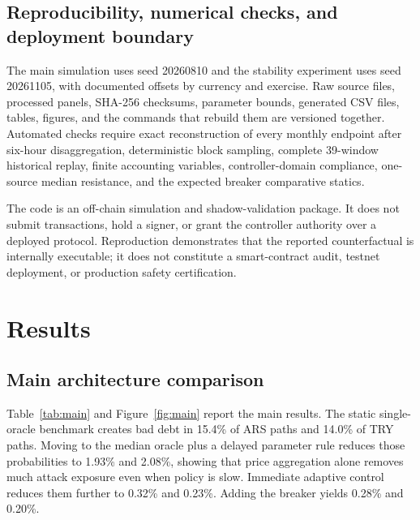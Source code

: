 \documentclass[sn-vancouver,Numbered]{sn-jnl}
\begin{document}
\subsection{Reproducibility, numerical checks, and deployment boundary}

The main simulation uses seed 20260810 and the stability experiment uses seed
20261105, with documented offsets by currency and exercise. Raw source files,
processed panels, SHA-256 checksums, parameter bounds, generated CSV files,
tables, figures, and the commands that rebuild them are versioned together.
Automated checks require exact reconstruction of every monthly endpoint after
six-hour disaggregation, deterministic block sampling, complete 39-window
historical replay, finite accounting variables, controller-domain compliance,
one-source median resistance, and the expected breaker comparative statics.

The code is an off-chain simulation and shadow-validation package. It does not
submit transactions, hold a signer, or grant the controller authority over a
deployed protocol. Reproduction demonstrates that the reported counterfactual
is internally executable; it does not constitute a smart-contract audit,
testnet deployment, or production safety certification.

\section{Results}\label{sec:results}

\subsection{Main architecture comparison}

Table~\ref{tab:main} and Figure~\ref{fig:main} report the main results. The static single-oracle benchmark creates bad debt in 15.4\% of ARS paths and 14.0\% of TRY paths. Moving to the median oracle plus a delayed parameter rule reduces those probabilities to 1.93\% and 2.08\%, showing that price aggregation alone removes much attack exposure even when policy is slow. Immediate adaptive control reduces them further to 0.32\% and 0.23\%. Adding the breaker yields 0.28\% and 0.20\%.

\begin{table}[t]
\centering
\caption{Main bootstrap results. Credit is cumulative accepted credit in initial-ceiling units; oracle MAE is mean absolute log-ratio error.}\label{tab:main}
\small

\end{table}
\end{document}
